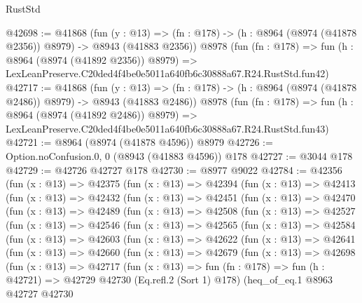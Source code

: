 \begin{lexlean}{RustStd}
\begin{coremodule}
@42698 := @41868
    (fun (y : @13) =>
    (fn : @178) -> (h : @8964 (@8974 (@41878 @2356)) @8979) -> @8943 (@41883 @2356))
    @8978
    (fun (fn : @178) =>
    fun (h : @8964 (@8974 (@41892 @2356)) @8979) =>
    LexLeanPreserve.C20ded4f4be0e5011a640fb6c30888a67.R24.RustStd.fun42)
@42717 := @41868
    (fun (y : @13) =>
    (fn : @178) -> (h : @8964 (@8974 (@41878 @2486)) @8979) -> @8943 (@41883 @2486))
    @8978
    (fun (fn : @178) =>
    fun (h : @8964 (@8974 (@41892 @2486)) @8979) =>
    LexLeanPreserve.C20ded4f4be0e5011a640fb6c30888a67.R24.RustStd.fun43)
@42721 := @8964 (@8974 (@41878 @4596)) @8979
@42726 := Option.noConfusion.{0, 0} (@8943 (@41883 @4596)) @178
@42727 := @3044 @178
@42729 := @42726 @42727 @178
@42730 := @8977 @9022
@42784 := @42356
    (fun (x : @13) =>
    @42375
      (fun (x : @13) =>
      @42394
        (fun (x : @13) =>
        @42413
          (fun (x : @13) =>
          @42432
            (fun (x : @13) =>
            @42451
              (fun (x : @13) =>
              @42470
                (fun (x : @13) =>
                @42489
                  (fun (x : @13) =>
                  @42508
                    (fun (x : @13) =>
                    @42527
                      (fun (x : @13) =>
                      @42546
                        (fun (x : @13) =>
                        @42565
                          (fun (x : @13) =>
                          @42584
                            (fun (x : @13) =>
                            @42603
                              (fun (x : @13) =>
                              @42622
                                (fun (x : @13) =>
                                @42641
                                  (fun (x : @13) =>
                                  @42660
                                    (fun (x : @13) =>
                                    @42679
                                      (fun (x : @13) =>
                                      @42698
                                        (fun (x : @13) =>
                                        @42717
                                          (fun (x : @13) =>
                                          fun (fn : @178) =>
                                          fun (h : @42721) =>
                                          @42729
                                            @42730
                                            (Eq.refl.{2} (Sort 1) @178)
                                            (heq_of_eq.{1}
                                              @8963
                                              @42727
                                              @42730

\end{coremodule}
\end{lexlean}
